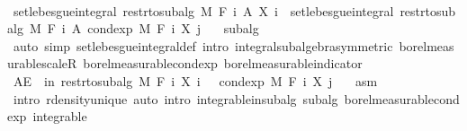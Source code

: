 \begin{isabellebody}
\ \ \ \ \isamarkupfalse%
\ \isamarkupfalse%
\ {\isachardoublequoteopen}set{\isacharunderscore}{\kern0pt}lebesgue{\isacharunderscore}{\kern0pt}integral\ {\isacharparenleft}{\kern0pt}restr{\isacharunderscore}{\kern0pt}to{\isacharunderscore}{\kern0pt}subalg\ M\ {\isacharparenleft}{\kern0pt}F\ i{\isacharparenright}{\kern0pt}{\isacharparenright}{\kern0pt}\ A\ {\isacharparenleft}{\kern0pt}X\ i{\isacharparenright}{\kern0pt}\ {\isacharequal}{\kern0pt}\ set{\isacharunderscore}{\kern0pt}lebesgue{\isacharunderscore}{\kern0pt}integral\ {\isacharparenleft}{\kern0pt}restr{\isacharunderscore}{\kern0pt}to{\isacharunderscore}{\kern0pt}subalg\ M\ {\isacharparenleft}{\kern0pt}F\ i{\isacharparenright}{\kern0pt}{\isacharparenright}{\kern0pt}\ A\ {\isacharparenleft}{\kern0pt}cond{\isacharunderscore}{\kern0pt}exp\ M\ {\isacharparenleft}{\kern0pt}F\ i{\isacharparenright}{\kern0pt}\ {\isacharparenleft}{\kern0pt}X\ j{\isacharparenright}{\kern0pt}{\isacharparenright}{\kern0pt}{\isachardoublequoteclose}\ \isamarkupfalse%
\ {\isacharasterisk}{\kern0pt}\ subalg\ \isamarkupfalse%
\ {\isacharparenleft}{\kern0pt}auto\ simp{\isacharcolon}{\kern0pt}\ set{\isacharunderscore}{\kern0pt}lebesgue{\isacharunderscore}{\kern0pt}integral{\isacharunderscore}{\kern0pt}def\ intro{\isacharbang}{\kern0pt}{\isacharcolon}{\kern0pt}\ integral{\isacharunderscore}{\kern0pt}subalgebra{}{\isacharbrackleft}{\kern0pt}symmetric{\isacharbrackright}{\kern0pt}\ borel{\isacharunderscore}{\kern0pt}measurable{\isacharunderscore}{\kern0pt}scaleR\ borel{\isacharunderscore}{\kern0pt}measurable{\isacharunderscore}{\kern0pt}cond{\isacharunderscore}{\kern0pt}exp\ borel{\isacharunderscore}{\kern0pt}measurable{\isacharunderscore}{\kern0pt}indicator{\isacharparenright}{\kern0pt}\isanewline
\ \ \isacommand{{\isacharbraceright}{\kern0pt}}\isamarkupfalse%
\isanewline
\ \ \isamarkupfalse%
\ {\isachardoublequoteopen}AE\ {\isasymxi}\ in\ restr{\isacharunderscore}{\kern0pt}to{\isacharunderscore}{\kern0pt}subalg\ M\ {\isacharparenleft}{\kern0pt}F\ i{\isacharparenright}{\kern0pt}{\isachardot}{\kern0pt}\ X\ i\ {\isasymxi}\ {\isacharequal}{\kern0pt}\ cond{\isacharunderscore}{\kern0pt}exp\ M\ {\isacharparenleft}{\kern0pt}F\ i{\isacharparenright}{\kern0pt}\ {\isacharparenleft}{\kern0pt}X\ j{\isacharparenright}{\kern0pt}\ {\isasymxi}{\isachardoublequoteclose}\ \isamarkupfalse%
\ asm\ \isamarkupfalse%
\ {\isacharparenleft}{\kern0pt}intro\ r{\isachardot}{\kern0pt}density{\isacharunderscore}{\kern0pt}unique{\isacharcomma}{\kern0pt}\ auto\ intro{\isacharcolon}{\kern0pt}\ integrable{\isacharunderscore}{\kern0pt}in{\isacharunderscore}{\kern0pt}subalg\ subalg\ borel{\isacharunderscore}{\kern0pt}measurable{\isacharunderscore}{\kern0pt}cond{\isacharunderscore}{\kern0pt}exp\ integrable{\isacharparenright}{\kern0pt}\isanewline

\end{isabellebody}
